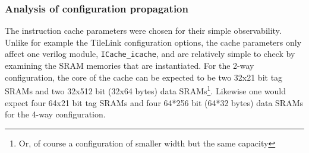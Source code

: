 \documentclass[journal,a4paper]{IEEEtran}
\makeatletter
\newcommand\footnoteref[1]{\protected@xdef\@thefnmark{\ref{#1}}\@footnotemark}
\makeatother
\begin{document}
\subsubsection{Analysis of configuration propagation}
The instruction cache parameters were chosen for their simple observability. Unlike for example the TileLink configuration options, the cache parameters only affect one verilog module, \texttt{ICache\_icache}, and are relatively simple to check by examining the SRAM memories that are instantiated.
For the 2-way configuration, the core of the cache can be expected to be two 32x21 bit tag SRAMs and two 32x512 bit (32x64 bytes) data SRAMs\footnote{\label{note-width}Or, of course a configuration of smaller width but the same capacity}.
Likewise one would expect four 64x21 bit tag SRAMs and four 64*256 bit (64*32 bytes) data SRAMs\footnoteref{note-width} for the 4-way configuration.

\end{document}
